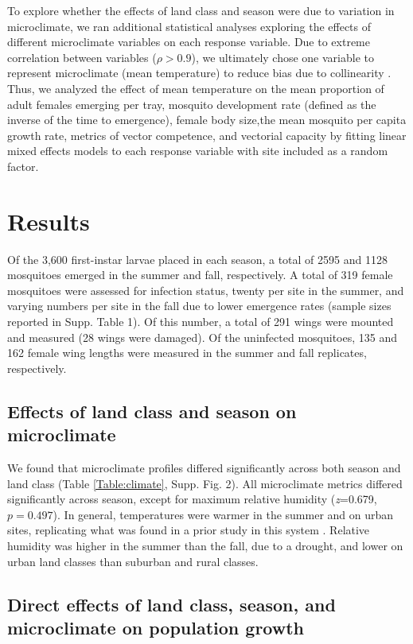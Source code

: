 \documentclass[12pt]{article}
\begin{document}
To explore whether the effects of land class and season were due to variation in microclimate, we ran additional statistical analyses exploring the effects of different microclimate variables on each response variable. Due to extreme correlation between variables ($\rho>0.9$), we ultimately chose one variable to represent microclimate (mean temperature) to reduce bias due to collinearity \citep{graham2003}. Thus, we analyzed the effect of mean temperature on the mean proportion of adult females emerging per tray, mosquito development rate (defined as the inverse of the time to emergence), female body size,the mean mosquito per capita growth rate, metrics of vector competence, and vectorial capacity by fitting linear mixed effects models to each response variable with site included as a random factor.

\section{Results}

Of the 3,600 first-instar larvae placed in each season, a total of 2595 and 1128 mosquitoes emerged in the summer and fall, respectively. A total of 319 female mosquitoes were assessed for infection status, twenty per site in the summer, and varying numbers per site in the fall due to lower emergence rates (sample sizes reported in Supp. Table 1). Of this number, a total of 291 wings were mounted and measured (28 wings were damaged). Of the uninfected mosquitoes, 135 and 162 female wing lengths were measured in the summer and fall replicates, respectively.

\subsection{Effects of land class and season on microclimate}

We found that microclimate profiles differed significantly across both season and land class (Table \ref{Table:climate}, Supp. Fig. 2). All microclimate metrics differed significantly across season, except for maximum relative humidity (\textit{z}=0.679, $p=0.497$). In general, temperatures were warmer in the summer and on urban sites, replicating what was found in a prior study in this system \citep{murdock2017}. Relative humidity was higher in the summer than the fall, due to a drought, and lower on urban land classes than suburban and rural classes.

\subsection{Direct effects of land class, season, and microclimate on population growth}
\end{document}
